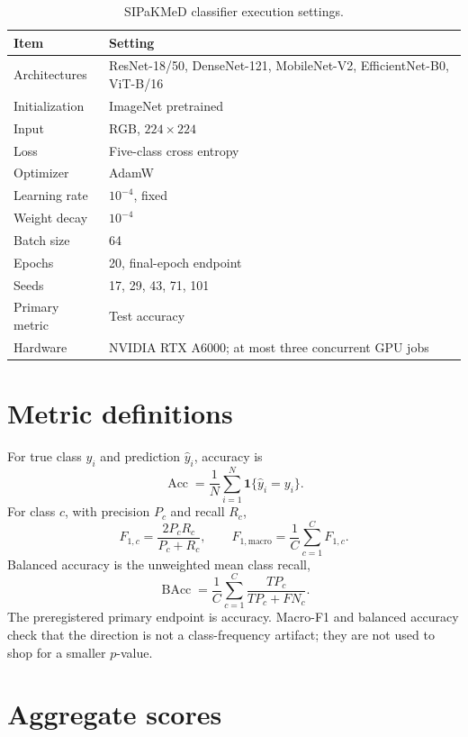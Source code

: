 \begin{table}[H]
\centering
\caption{SIPaKMeD classifier execution settings.}
\label{s1:tab:classifier-hparams}
\begin{tabular}{ll}
\toprule
Item & Setting \\
\midrule
Architectures & ResNet-18/50, DenseNet-121, MobileNet-V2, EfficientNet-B0, ViT-B/16 \\
Initialization & ImageNet pretrained \\
Input & RGB, $224\times224$ \\
Loss & Five-class cross entropy \\
Optimizer & AdamW \\
Learning rate & $10^{-4}$, fixed \\
Weight decay & $10^{-4}$ \\
Batch size & 64 \\
Epochs & 20, final-epoch endpoint \\
Seeds & 17, 29, 43, 71, 101 \\
Primary metric & Test accuracy \\
Hardware & NVIDIA RTX A6000; at most three concurrent GPU jobs \\
\bottomrule
\end{tabular}
\end{table}

\section{Metric definitions}

For true class $y_i$ and prediction $\hat y_i$, accuracy is
\begin{equation}
\operatorname{Acc}=\frac{1}{N}\sum_{i=1}^{N}\mathbf{1}\{\hat y_i=y_i\}.
\end{equation}
For class $c$, with precision $P_c$ and recall $R_c$,
\begin{equation}
F_{1,c}=\frac{2P_cR_c}{P_c+R_c},\qquad
F_{1,\mathrm{macro}}=\frac{1}{C}\sum_{c=1}^{C}F_{1,c}.
\end{equation}
Balanced accuracy is the unweighted mean class recall,
\begin{equation}
\operatorname{BAcc}=\frac{1}{C}\sum_{c=1}^{C}\frac{TP_c}{TP_c+FN_c}.
\end{equation}
The preregistered primary endpoint is accuracy. Macro-F1 and balanced accuracy check that the direction is not a class-frequency artifact; they are not used to shop for a smaller $p$-value.

\section{Aggregate scores}

